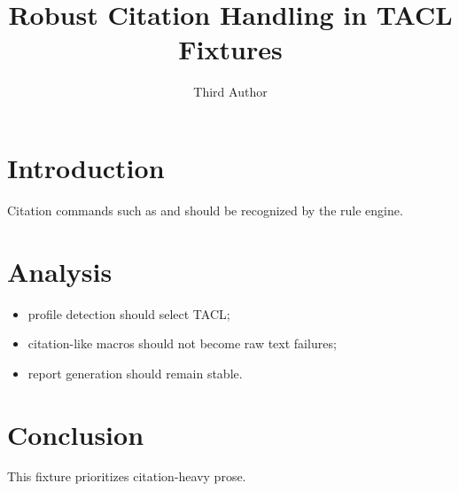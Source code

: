 \documentclass[aclang]{acl}
\begin{document}
\title{Robust Citation Handling in TACL Fixtures}
\author{Third Author}
\aclfinalcopy
\section{Introduction}
Citation commands such as \citep{a2024} and \citet{b2024} should be recognized by the rule engine.
\section{Analysis}
\begin{itemize}
\item profile detection should select TACL;
\item citation-like macros should not become raw text failures;
\item report generation should remain stable.
\end{itemize}
\section{Conclusion}
This fixture prioritizes citation-heavy prose.


\end{document}
